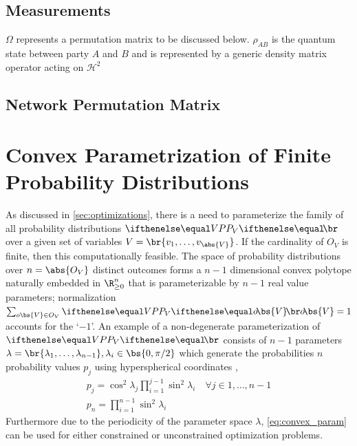 \documentclass[aps, 10pt, english, twoside, pra, nofootinbib, longbibliography]{revtex4-1}
\theoremstyle{plain}
\theoremstyle{definition}
\theoremstyle{remark}
\newcommand{\Hilb}{\mathcal{H}}
\newcommand{\outc}[1]{o\!\bs{#1}}
\begin{document}
    \subsection{Measurements}
    $\Omega$ represents a permutation matrix to be discussed below. $\rho_{AB}$ is the quantum state between party $A$ and $B$ and is represented by a generic density matrix operator acting on $\Hilb^2$

    \subsection{Network Permutation Matrix}

    \section{Convex Parametrization of Finite Probability Distributions}
    As discussed in \cref{sec:optimizations}, there is a need to parameterize the family of all probability distributions $\prob[V]$ over a given set of variables $V = \br{v_1, \ldots, v_{\abs{V}}}$. If the cardinality of $O_{V}$ is finite, then this computationally feasible. The space of probability distributions over $n = \abs{O_{V}}$ distinct outcomes forms a $n-1$ dimensional convex polytope naturally embedded in $\R_{\geq 0}^n$ \cite{Brunner_2013} that is parameterizable by $n-1$ real value parameters; normalization $\sum_{o\bs{V} \in O_V} \prob[V][\outc{V}] = 1$ accounts for the `$-1$'. An example of a non-degenerate parameterization of $\prob[V]$ consists of $n-1$ parameters $\lambda = \br{\lambda_1, \ldots, \lambda_{n-1}}, \lambda_i \in \bs{0, \pi/2}$ which generate the probabilities $n$ probability values $p_j$ using hyperspherical coordinates \cite{Hedemann_2013, Spengler_2010_Unitary},
    \begin{equation}
    \begin{gathered}
        \label{eq:convex_param}
        p_j = \cos^2 \lambda_j \prod_{i=1}^{j-1} \sin^2 \lambda_i \quad \forall j \in 1, \ldots, n - 1 \\
        p_n = \prod_{i=1}^{n-1} \sin^2 \lambda_i
    \end{gathered}
    \end{equation}
    Furthermore due to the periodicity of the parameter space $\lambda$, \cref{eq:convex_param} can be used for either constrained or unconstrained optimization problems.
\end{document}
